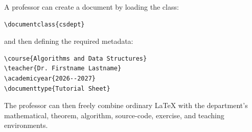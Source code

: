 \documentclass{csdept}
\begin{document}
A professor can create a document by loading the class:

\begin{verbatim}
\documentclass{csdept}
\end{verbatim}

and then defining the required metadata:

\begin{verbatim}
\course{Algorithms and Data Structures}
\teacher{Dr. Firstname Lastname}
\academicyear{2026--2027}
\documenttype{Tutorial Sheet}
\end{verbatim}

The professor can then freely combine ordinary LaTeX with the
department's mathematical, theorem, algorithm, source-code,
exercise, and teaching environments.
\end{document}
